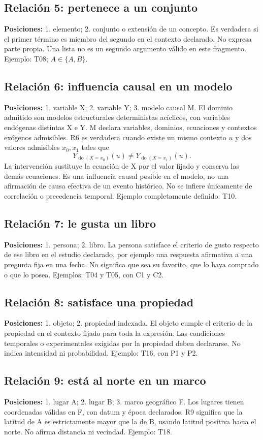 \subsection{Relación 5: pertenece a un conjunto}
\textbf{Posiciones:} 1. elemento; 2. conjunto o extensión de un concepto.
Es verdadera si el primer término es miembro del segundo en el contexto declarado.
No expresa parte propia. Una lista no es un segundo argumento válido en este fragmento.
Ejemplo: T08; \(A\in\{A,B\}\).

\subsection{Relación 6: influencia causal en un modelo}
\textbf{Posiciones:} 1. variable X; 2. variable Y; 3. modelo causal M.
El dominio admitido son modelos estructurales deterministas acíclicos, con variables
endógenas distintas X e Y. M declara variables, dominios, ecuaciones y contextos
exógenos admisibles. R6 es verdadera cuando existe un mismo contexto \(u\) y dos
valores admisibles \(x_0,x_1\) tales que
\[
 Y_{\operatorname{do}(X=x_0)}(u)\ne
 Y_{\operatorname{do}(X=x_1)}(u).
\]
La intervención sustituye la ecuación de X por el valor fijado y conserva las
demás ecuaciones. Es una influencia causal posible en el modelo, no una
afirmación de causa efectiva de un evento histórico. No se infiere únicamente de
correlación o precedencia temporal. Ejemplo completamente definido: T10.

\subsection{Relación 7: le gusta un libro}
\textbf{Posiciones:} 1. persona; 2. libro.
La persona satisface el criterio de gusto respecto de ese libro en el estudio
declarado, por ejemplo una respuesta afirmativa a una pregunta fija en una fecha.
No significa que sea su favorito, que lo haya comprado o que lo posea.
Ejemplos: T04 y T05, con C1 y C2.

\subsection{Relación 8: satisface una propiedad}
\textbf{Posiciones:} 1. objeto; 2. propiedad indexada.
El objeto cumple el criterio de la propiedad en el contexto fijado para toda la
expresión. Las condiciones temporales o experimentales exigidas por la propiedad
deben declararse. No indica intensidad ni probabilidad. Ejemplo: T16, con P1 y P2.

\subsection{Relación 9: está al norte en un marco}
\textbf{Posiciones:} 1. lugar A; 2. lugar B; 3. marco geográfico F.
Los lugares tienen coordenadas válidas en F, con datum y época declarados. R9
significa que la latitud de A es estrictamente mayor que la de B, usando latitud
positiva hacia el norte. No afirma distancia ni vecindad. Ejemplo: T18.

